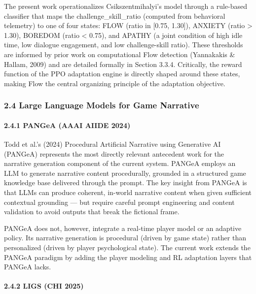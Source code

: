 The present work operationalizes Csikszentmihalyi's model through a
rule-based classifier that maps the challenge\_skill\_ratio (computed
from behavioral telemetry) to one of four states: FLOW (ratio in
{[}0.75, 1.30{]}), ANXIETY (ratio \textgreater{} 1.30), BOREDOM (ratio
\textless{} 0.75), and APATHY (a joint condition of high idle time, low
dialogue engagement, and low challenge-skill ratio). These thresholds
are informed by prior work on computational Flow detection (Yannakakis
\& Hallam, 2009) and are detailed formally in Section 3.3.4. Critically,
the reward function of the PPO adaptation engine is directly shaped
around these states, making Flow the central organizing principle of the
adaptation objective.

\subsubsection{2.4 Large Language Models for Game
Narrative}\label{large-language-models-for-game-narrative}

\paragraph{2.4.1 PANGeA (AAAI AIIDE 2024)}\label{pangea-aaai-aiide-2024}

Todd et al.'s (2024) Procedural Artificial Narrative using Generative AI
(PANGeA) represents the most directly relevant antecedent work for the
narrative generation component of the current system. PANGeA employs an
LLM to generate narrative content procedurally, grounded in a structured
game knowledge base delivered through the prompt. The key insight from
PANGeA is that LLMs can produce coherent, in-world narrative content
when given sufficient contextual grounding --- but require careful
prompt engineering and content validation to avoid outputs that break
the fictional frame.

PANGeA does not, however, integrate a real-time player model or an
adaptive policy. Its narrative generation is procedural (driven by game
state) rather than personalized (driven by player psychological state).
The current work extends the PANGeA paradigm by adding the player
modeling and RL adaptation layers that PANGeA lacks.

\paragraph{2.4.2 LIGS (CHI 2025)}\label{ligs-chi-2025}

